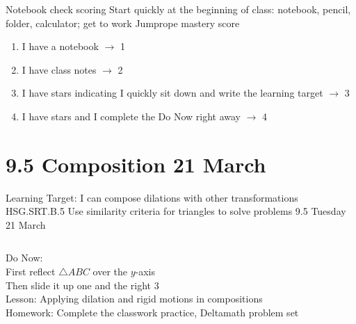 \begin{frame}{Notebook check scoring}
  {Start quickly at the beginning of class: notebook, pencil, folder, calculator; get to work}
    Jumprope mastery score
    \begin{enumerate}
      \item I have a notebook $\rightarrow$ 1
      \item I have class notes $\rightarrow$ 2
      \item I have stars indicating I quickly sit down and write the learning target $\rightarrow$ 3
      \item I have stars and I complete the Do Now right away $\rightarrow$ 4
    \end{enumerate} \bigskip
\end{frame}


\section{9.5 Composition \hfill 21 March \,}
\begin{frame}{Learning Target: I can compose dilations with other transformations}
  {HSG.SRT.B.5 Use similarity criteria for triangles to solve problems \hfill \alert{9.5 Tuesday 21 March}}
  \begin{columns}
    Do Now:\\
    First reflect $\triangle ABC$ over the $y$-axis \\
    Then slide it up one and the right 3 \\[0.5cm]
    Lesson: Applying dilation and rigid motions in compositions \\[0.5cm]
    Homework: Complete the classwork practice, Deltamath problem set \\[0.5cm]
    \begin{flushright}
    \end{flushright}
  \end{columns}
\end{frame}


